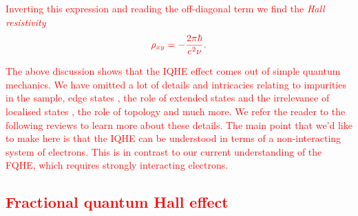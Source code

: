  \textcolor{red}{ Inverting this expression and reading the off-diagonal term we find the \textit{Hall resistivity} }
\begin{align}
    \textcolor{red}{ \rho_{xy} = - \frac{2 \pi \hbar}{e^2 \nu}.}
\end{align}


 \textcolor{red}{The above discussion shows that the IQHE effect comes out of simple quantum mechanics. We have omitted a lot of details and intricacies relating to impurities in the sample, edge states \cite{PhysRevB.25.2185}, the role of extended states and the irrelevance of locali\textcolor{red}{s}ed states \cite{PhysRevB.23.5632}, the role of topology and much more. We refer the reader to the following reviews \cite{hep-th/0509216, yoshioka2002the, Girvin} to learn more about these details. The main point that we'd like to make here is that the IQHE can be understood in terms of a non-interacting system of electrons. This is in contrast to our current understanding of the FQHE, which requires strongly interacting electrons.}


 \textcolor{red}{\subsection{Fractional quantum Hall effect}}

